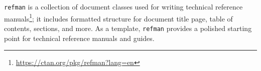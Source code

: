 \begin{minipage}{\linewidth}
\end{minipage}

\texttt{refman} is a collection of document classes used for writing technical reference manuals\footnote{\url{https://ctan.org/pkg/refman?lang=en}}; it includes formatted structure for document title page, table of contents, sections, and more. As a template, \texttt{refman} provides a polished starting point for technical reference manuals and guides.

\begin{minipage}{\linewidth}
\end{minipage}

